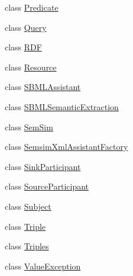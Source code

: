 \begin{DoxyCompactItemize}
\item 
class \hyperlink{classomexmeta_1_1Predicate}{Predicate}
\item 
class \hyperlink{classomexmeta_1_1Query}{Query}
\item 
class \hyperlink{classomexmeta_1_1RDF}{R\+DF}
\item 
class \hyperlink{classomexmeta_1_1Resource}{Resource}
\item 
class \hyperlink{classomexmeta_1_1SBMLAssistant}{S\+B\+M\+L\+Assistant}
\item 
class \hyperlink{classomexmeta_1_1SBMLSemanticExtraction}{S\+B\+M\+L\+Semantic\+Extraction}
\item 
class \hyperlink{classomexmeta_1_1SemSim}{Sem\+Sim}
\item 
class \hyperlink{classomexmeta_1_1SemsimXmlAssistantFactory}{Semsim\+Xml\+Assistant\+Factory}
\item 
class \hyperlink{classomexmeta_1_1SinkParticipant}{Sink\+Participant}
\item 
class \hyperlink{classomexmeta_1_1SourceParticipant}{Source\+Participant}
\item 
class \hyperlink{classomexmeta_1_1Subject}{Subject}
\item 
class \hyperlink{classomexmeta_1_1Triple}{Triple}
\item 
class \hyperlink{classomexmeta_1_1Triples}{Triples}
\item 
class \hyperlink{classomexmeta_1_1ValueException}{Value\+Exception}
\end{DoxyCompactItemize}
